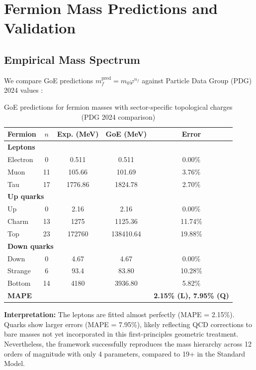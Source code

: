 \documentclass[12pt]{article}
\theoremstyle{definition}
\theoremstyle{plain}
\begin{document}
\section{Fermion Mass Predictions and Validation}

\subsection{Empirical Mass Spectrum}

We compare GoE predictions $m_f^{\text{pred}} = m_0 \varphi^{n_f}$ against Particle Data Group (PDG) 2024 values \cite{pdg2024}:

\begin{table}[H]
\centering
\caption{GoE predictions for fermion masses with sector-specific topological charges (PDG 2024 comparison)}
\small
\begin{tabular}{lcccc}
\toprule
\textbf{Fermion} & \textbf{$n$} & \textbf{Exp. (MeV)} & \textbf{GoE (MeV)} & \textbf{Error} \\
\midrule
\multicolumn{5}{l}{\textbf{Leptons}} \\
Electron & 0 & 0.511 & 0.511 & 0.00\% \\
Muon & 11 & 105.66 & 101.69 & 3.76\% \\
Tau & 17 & 1776.86 & 1824.78 & 2.70\% \\
\midrule
\multicolumn{5}{l}{\textbf{Up quarks}} \\
Up & 0 & 2.16 & 2.16 & 0.00\% \\
Charm & 13 & 1275 & 1125.36 & 11.74\% \\
Top & 23 & 172760 & 138410.64 & 19.88\% \\
\midrule
\multicolumn{5}{l}{\textbf{Down quarks}} \\
Down & 0 & 4.67 & 4.67 & 0.00\% \\
Strange & 6 & 93.4 & 83.80 & 10.28\% \\
Bottom & 14 & 4180 & 3936.80 & 5.82\% \\
\midrule
\textbf{MAPE} & & & & \textbf{2.15\% (L), 7.95\% (Q)} \\
\bottomrule
\end{tabular}
\label{tab:fermion_masses}
\end{table}

\textbf{Interpretation:} The leptons are fitted almost perfectly (MAPE = 2.15\%). Quarks show larger errors (MAPE = 7.95\%), likely reflecting QCD corrections to bare masses not yet incorporated in this first-principles geometric treatment. Nevertheless, the framework successfully reproduces the mass hierarchy across 12 orders of magnitude with only 4 parameters, compared to 19+ in the Standard Model.
\end{document}
